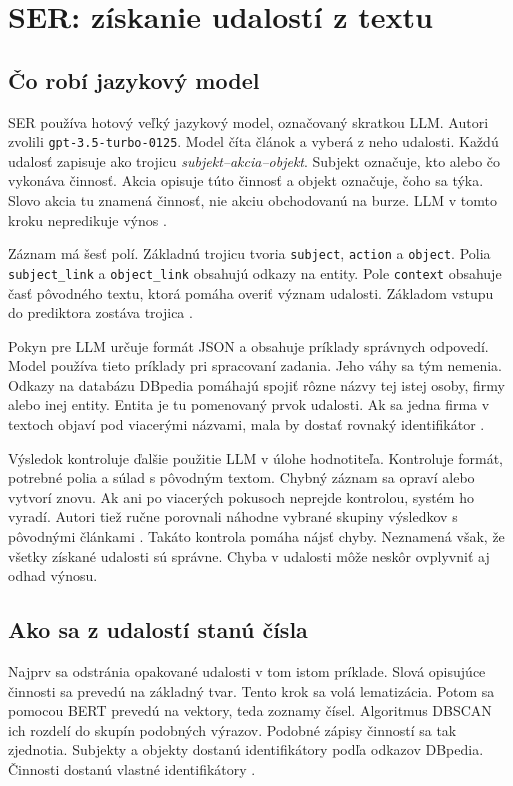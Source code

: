 \section{SER: získanie udalostí z textu}
\subsection{Čo robí jazykový model}
SER používa hotový veľký jazykový model, označovaný skratkou LLM. Autori zvolili \texttt{gpt-3.5-turbo-0125}. Model číta článok a vyberá z neho udalosti. Každú udalosť zapisuje ako trojicu \emph{subjekt--akcia--objekt}. Subjekt označuje, kto alebo čo vykonáva činnosť. Akcia opisuje túto činnosť a objekt označuje, čoho sa týka. Slovo akcia tu znamená činnosť, nie akciu obchodovanú na burze. LLM v tomto kroku nepredikuje výnos .

Záznam má šesť polí. Základnú trojicu tvoria \texttt{subject}, \texttt{action} a \texttt{object}. Polia \texttt{subject\_link} a \texttt{object\_link} obsahujú odkazy na entity. Pole \texttt{context} obsahuje časť pôvodného textu, ktorá pomáha overiť význam udalosti. Základom vstupu do prediktora zostáva trojica .

Pokyn pre LLM určuje formát JSON a obsahuje príklady správnych odpovedí. Model používa tieto príklady pri spracovaní zadania. Jeho váhy sa tým nemenia. Odkazy na databázu DBpedia pomáhajú spojiť rôzne názvy tej istej osoby, firmy alebo inej entity. Entita je tu pomenovaný prvok udalosti. Ak sa jedna firma v textoch objaví pod viacerými názvami, mala by dostať rovnaký identifikátor .

Výsledok kontroluje ďalšie použitie LLM v úlohe hodnotiteľa. Kontroluje formát, potrebné polia a súlad s pôvodným textom. Chybný záznam sa opraví alebo vytvorí znovu. Ak ani po viacerých pokusoch neprejde kontrolou, systém ho vyradí. Autori tiež ručne porovnali náhodne vybrané skupiny výsledkov s pôvodnými článkami . Takáto kontrola pomáha nájsť chyby. Neznamená však, že všetky získané udalosti sú správne. Chyba v udalosti môže neskôr ovplyvniť aj odhad výnosu.

\subsection{Ako sa z udalostí stanú čísla}
Najprv sa odstránia opakované udalosti v tom istom príklade. Slová opisujúce činnosti sa prevedú na základný tvar. Tento krok sa volá lematizácia. Potom sa pomocou BERT prevedú na vektory, teda zoznamy čísel. Algoritmus DBSCAN ich rozdelí do skupín podobných výrazov. Podobné zápisy činností sa tak zjednotia. Subjekty a objekty dostanú identifikátory podľa odkazov DBpedia. Činnosti dostanú vlastné identifikátory .

